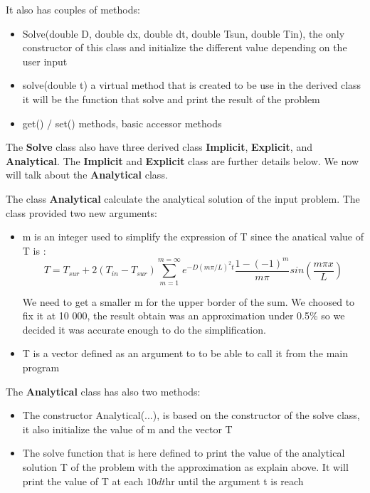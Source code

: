 \documentclass [10 pt, a4 paper]{article}
\begin{document}
\vspace{0.3cm}
It also has couples of methods:
\begin{itemize}
    \item Solve(double D, double dx, double dt, double Tsun, double Tin), the only constructor of 
    this class and initialize the different value depending on the user input
    \item solve(double t) a virtual method that is created to be use in the derived class it will be the function
    that solve and print the result of the problem
    \item get() / set() methods, basic accessor methods
\end{itemize}

\vspace{0.3cm}
The \textbf{Solve} class also have three derived class \textbf{Implicit}, \textbf{Explicit}, and \textbf{Analytical}.
The \textbf{Implicit} and \textbf{Explicit} class are further details below. We now will talk about the \textbf{Analytical} class.
\vspace{0.3cm}

The class \textbf{Analytical} calculate the analytical solution of the input problem.
The class provided two new arguments:
\begin{itemize}
    \item m is an integer used to simplify the expression of T since the anatical value of T is : 
    \begin{equation}
        T = T_{sur} + 2(T_{in}-T_{sur}) \sum_{m=1}^{m=\infty} e^{-D(m\pi /L)^{2}t} \frac{1-(-1)^{m}}{m\pi} sin(\frac{m\pi x}{L})
    \end{equation}

    We need to get a smaller m for the upper border of the sum. We choosed to fix it at 10 000, 
    the result obtain was an approximation under 0.5\% so we decided it was accurate enough to do 
    the simplification.

    \item T is a vector defined as an argument to to be able to call it from the main program
\end{itemize}
The \textbf{Analytical} class has also two methods:
\begin{itemize}
    \item The constructor Analytical(...), is based on the constructor of the solve class, it also
    initialize the value of m and the vector T
    \item The solve function that is here defined to print the value of the analytical solution T 
    of the problem with the approximation as explain above. It will print the value of T at each $10dt$hr
    until the argument t is reach
\end{itemize}
\end{document}
